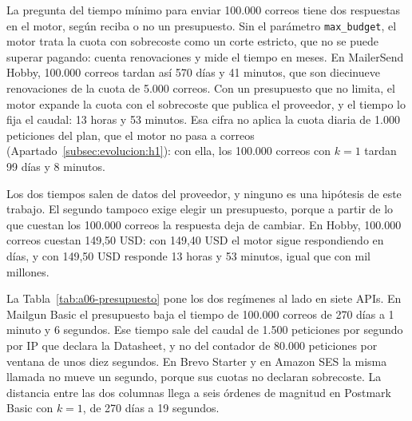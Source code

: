 La pregunta del tiempo mínimo para enviar 100.000 correos tiene dos respuestas en el motor, según reciba o no un presupuesto.
Sin el parámetro \texttt{max\_budget}, el motor trata la cuota con sobrecoste como un corte estricto, que no se puede superar pagando: cuenta renovaciones y mide el tiempo en meses.
En MailerSend Hobby, 100.000 correos tardan así 570 días y 41 minutos, que son diecinueve renovaciones de la cuota de 5.000 correos.
Con un presupuesto que no limita, el motor expande la cuota con el sobrecoste que publica el proveedor, y el tiempo lo fija el caudal: 13 horas y 53 minutos.
Esa cifra no aplica la cuota diaria de 1.000 peticiones del plan, que el motor no pasa a correos (Apartado~\ref{subsec:evolucion:h1}): con ella, los 100.000 correos con $k = 1$ tardan 99 días y 8 minutos.

Los dos tiempos salen de datos del proveedor, y ninguno es una hipótesis de este trabajo.
El segundo tampoco exige elegir un presupuesto, porque a partir de lo que cuestan los 100.000 correos la respuesta deja de cambiar.
En Hobby, 100.000 correos cuestan 149,50 USD: con 149,40 USD el motor sigue respondiendo en días, y con 149,50 USD responde 13 horas y 53 minutos, igual que con mil millones.

La Tabla~\ref{tab:a06-presupuesto} pone los dos regímenes al lado en siete APIs.
En Mailgun Basic el presupuesto baja el tiempo de 100.000 correos de 270 días a 1 minuto y 6 segundos.
Ese tiempo sale del caudal de 1.500 peticiones por segundo por IP que declara la Datasheet, y no del contador de 80.000 peticiones por ventana de unos diez segundos.
En Brevo Starter y en Amazon SES la misma llamada no mueve un segundo, porque sus cuotas no declaran sobrecoste.
La distancia entre las dos columnas llega a seis órdenes de magnitud en Postmark Basic con $k = 1$, de 270 días a 19 segundos.

